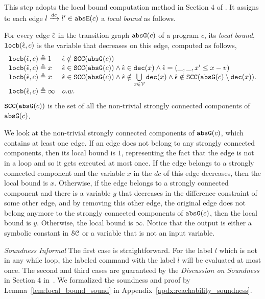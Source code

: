 \begin{enumerate}
This step adopts the local bound computation method in Section 4 of \cite{SinnZV17}.
It assigns to each edge $l \xrightarrow{dc} l'\in \mathtt{abs}{\mathtt{E}}(c)$ a \emph{local bound} as follows.
\begin{defn}
 \label{def:ranking_gen}
For every edge $\hat{\mathtt{\epsilon}{}}$ in the transition graph $\mathtt{abs}{\mathtt{G}}(c)$ of a program $c$,
its \emph{local bound}, $\mathtt{locb}(\hat{\mathtt{\epsilon}{}}, c)$
is the variable that decreases on this edge, computed as follows,
%
\[ 
\begin{array}{ll}
 \mathtt{locb}(\hat{\mathtt{\epsilon}{}}, c) \triangleq 1 
 & \hat{\mathtt{\epsilon}{}} \notin \mathtt{SCC}(\mathtt{abs}{\mathtt{G}}(c))
 \\
 \mathtt{locb}(\hat{\mathtt{\epsilon}{}}, c) \triangleq x
 & \hat{\mathtt{\epsilon}{}} \in \mathtt{SCC}(\mathtt{abs}{\mathtt{G}}(c)) \land \hat{\mathtt{\epsilon}{}} \in \mathtt{dec}(x) \land \hat{\mathtt{\epsilon}{}} = (\_, \_ , x' \leq x - v) \\
 \mathtt{locb}(\hat{\mathtt{\epsilon}{}}, c) \triangleq x
 & \hat{\mathtt{\epsilon}{}} \in \mathtt{SCC}(\mathtt{abs}{\mathtt{G}}(c)) \land 
 \hat{\mathtt{\epsilon}{}} \notin \bigcup\limits_{x \in \mathcal{V}} \mathtt{dec}(x)
 \land \hat{\mathtt{\epsilon}{}} \notin \mathtt{SCC}(\mathtt{abs}{\mathtt{G}}(c) \setminus \mathtt{dec}(x)). \\
 \mathtt{locb}(\hat{\mathtt{\epsilon}{}}, c) \triangleq \infty & o.w.
\end{array}
\]
$\mathtt{SCC}(\mathtt{abs}{\mathtt{G}}(c))$ is the set of all the non-trivial strongly connected components of $\mathtt{abs}{\mathtt{G}}(c)$.
\end{defn}
We look at the non-trivial strongly connected components of $\mathtt{abs}{\mathtt{G}}(c)$, which contains at least one edge.
If an edge does not belong to any strongly connected components, then its local bound is $1$, representing the fact that the edge is not in a loop and so it gets executed at most once.
If the edge belongs to a strongly connected component and the variable $x$ in the $dc$ of this edge
decreases, then the local bound is $x$.
Otherwise, if the edge belongs to a strongly connected component and there is a variable $y$ that decreases in the difference constraint of some other edge, and by removing this other edge, the original edge does not belong anymore to the strongly connected components of $\mathtt{abs}{\mathtt{G}}(c)$, then the local bound is $y$.
Otherwise, the local bound is $\infty$. 
Notice that the output is either a symbolic constant in $\mathcal{SC}$ or a variable that is not an input variable.

\emph{Soundness Informal}
 The first case is straightforward. 
 For the label $l$ which is not in any while loop, 
 the labeled command with the label $l$ will be 
 evaluated at most once. 
 The second and third cases are guaranteed by the \emph{Discussion on Soundness} in Section 4 in~\cite{SinnZV17}.
 We formalized the soundness and proof by Lemma~\ref{lem:local_bound_sound} in Appendix~\ref{apdx:reachability_soundness}.


\end{enumerate}

